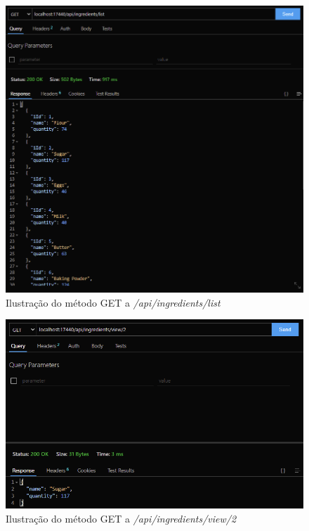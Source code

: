 \FloatBarrier
\begin{figure}[!hbt]
    \centering
    \includegraphics[width=14cm]{Resources/API/Ingredients/Ingredients (7).png}
    \caption{Ilustração do método GET a \textit{/api/ingredients/list}}
    \label{fig:api_ing_7}
\end{figure}
\FloatBarrier
\begin{figure}[!hbt]
    \centering
    \includegraphics[width=14cm]{Resources/API/Ingredients/Ingredients (8).png}
    \caption{Ilustração do método GET a \textit{/api/ingredients/view/2}}
    \label{fig:api_ing_8}
\end{figure}
\FloatBarrier

